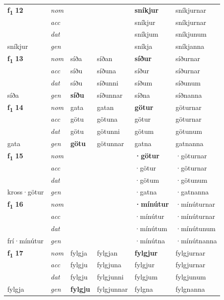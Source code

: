 \begin{longtable}[l]{X>{\footnotesize\itshape}XXXXX}
\multirow{3}{*}{{{\textbf{f{\textsubscript{1}}} \Large{\textbf{12}}}}} & nom &  &  & \textbf{sníkjur} & sníkjurnar \\*
 & acc &  &  & sníkjur & sníkjurnar \\*
 & dat &  &  & sníkjum & sníkjunum \\*
 {\footnotesize{sníkjur}} & gen & \textbf{} &  & sníkja & sníkjanna \\


\multirow{3}{*}{{{\textbf{f{\textsubscript{1}}} \Large{\textbf{13}}}}} & nom & síða & síðan & \textbf{síður} & síðurnar \\*
 & acc & síðu & síðuna & síður & síðurnar \\*
 & dat & síðu & síðunni & síðum & síðunum \\*
 {\footnotesize{síða}} & gen & \textbf{síðu} & síðunnar & síðna & síðnanna \\
\cmidrule{1-6}

\multirow{3}{*}{{{\textbf{f{\textsubscript{1}}} \Large{\textbf{14}}}}} & nom & gata & gatan & \textbf{götur} & göturnar \\*
 & acc & götu & götuna & götur & göturnar \\*
 & dat & götu & götunni & götum & götunum \\*
 {\footnotesize{gata}} & gen & \textbf{götu} & götunnar & gatna & gatnanna \\
\cmidrule{1-6}

\multirow{3}{*}{{{\textbf{f{\textsubscript{1}}} \Large{\textbf{15}}}}} & nom &  &  & \textbf{·götur} & ·göturnar \\*
 & acc &  &  & ·götur & ·göturnar \\*
 & dat &  &  & ·götum & ·götunum \\*
 {\footnotesize{kross\allowbreak ·götur}} & gen & \textbf{} &  & ·gatna & ·gatnanna \\
\cmidrule{1-6}

\multirow{3}{*}{{{\textbf{f{\textsubscript{1}}} \Large{\textbf{16}}}}} & nom &  &  & \textbf{·mínútur} & ·mínúturnar \\*
 & acc &  &  & ·mínútur & ·mínúturnar \\*
 & dat &  &  & ·mínútum & ·mínútunum \\*
 {\footnotesize{frí\allowbreak ·mínútur}} & gen & \textbf{} &  & ·mínútna & ·mínútnanna \\
\cmidrule{1-6}

\multirow{3}{*}{{{\textbf{f{\textsubscript{1}}} \Large{\textbf{17}}}}} & nom & fylgja & fylgjan & \textbf{fylgjur} & fylgjurnar \\*
 & acc & fylgju & fylgjuna & fylgjur & fylgjurnar \\*
 & dat & fylgju & fylgjunni & fylgjum & fylgjunum \\*
 {\footnotesize{fylgja}} & gen & \textbf{fylgju} & fylgjunnar & fylgna & fylgnanna \\
\cmidrule{1-6}


\end{longtable}
